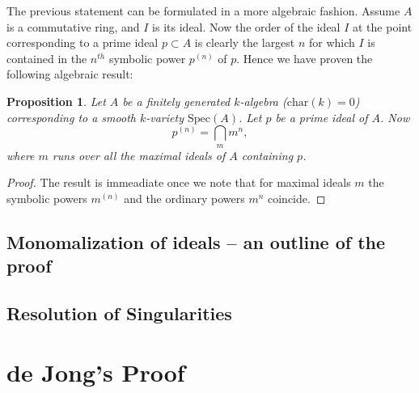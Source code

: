 \documentclass[12pt,a4paper,leqno]{article}
\newcommand{\spec}{\mathrm{Spec}}
\theoremstyle{plain}
\newtheorem{prop}[theo]{Proposition}
\theoremstyle{definition}
\theoremstyle{remark}
\begin{document}
The previous statement can be formulated in a more algebraic fashion. Assume $A$ is a commutative ring, and $I$ is its ideal. Now the order of the ideal $I$ at the point corresponding to a prime ideal $p \subset A$ is clearly the largest $n$ for which $I$ is contained in the $n^{th}$ symbolic power $p^{(n)}$ of $p$. Hence we have proven the following algebraic result:

\begin{prop}
Let $A$ be a finitely generated $k$-algebra ($\mathrm{char} (k) = 0$) corresponding to a smooth $k$-variety $\spec (A)$. Let $p$ be a prime ideal of $A$. Now
\begin{equation*}
p^{(n)} = \bigcap_m m^n,
\end{equation*}
where $m$ runs over all the maximal ideals of $A$ containing $p$.
\end{prop}
\begin{proof}
The result is immeadiate once we note that for maximal ideals $m$ the symbolic powers $m^{(n)}$ and the ordinary powers $m^n$ coincide.
\end{proof}
\subsection{Monomalization of ideals -- an outline of the proof}

\subsection{Resolution of Singularities}

\section{de Jong's Proof}\label{deJongRes}
\end{document}
